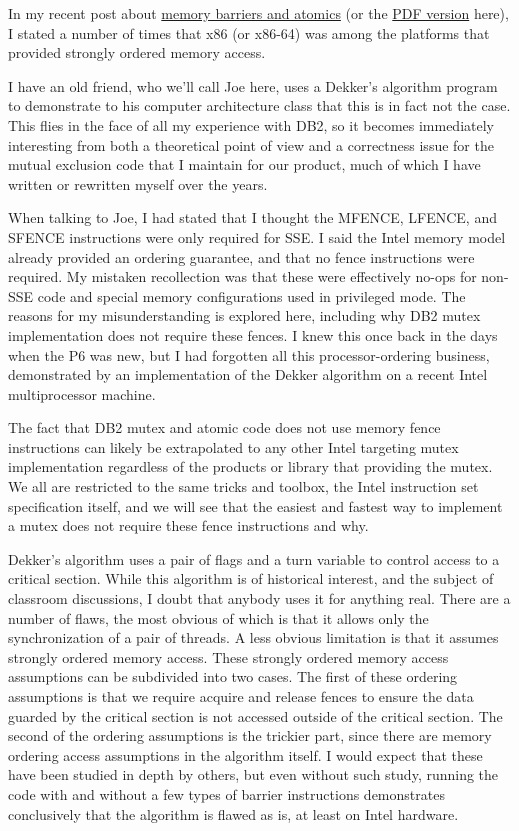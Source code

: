 In my recent post about \href{http://wp.me/ppf39-c1}{memory barriers and atomics} (or the \href{http://sites.google.com/site/peeterjoot/math2009/atomic.pdf?revision=1}{PDF version} here), I stated a number of times that x86 (or x86-64) was among the platforms that provided strongly ordered memory access.

I have an old friend, who we'll call Joe here, uses a Dekker's algorithm program to demonstrate to his computer architecture class that this is in fact not the case.  This flies in the face of all my experience with DB2, so it becomes immediately interesting from both a theoretical point of view and a correctness issue for the mutual exclusion code that I maintain for our product, much of which I have written or rewritten myself over the years.

When talking to Joe, I had stated that I thought the MFENCE, LFENCE, and SFENCE instructions were only required for SSE.  I said the Intel memory model already provided an ordering guarantee, and that no fence instructions were required.  My mistaken recollection was that these were effectively no-ops for non-SSE code and special memory configurations used in privileged mode.  
The reasons for my misunderstanding is explored here, including why DB2 mutex implementation does not require these fences.  I knew this once back in the days when the P6 was new, but I had forgotten all this processor-ordering business, demonstrated by an implementation of the Dekker algorithm on a recent Intel multiprocessor machine.

The fact that DB2 mutex and atomic code does not use memory fence instructions can likely be extrapolated to any other Intel targeting mutex implementation regardless of the products or library that providing the mutex.  We all are restricted to the same tricks and toolbox, the Intel instruction set specification itself, and we will see that the easiest and fastest way to implement a mutex does not require these fence instructions and why.

Dekker's algorithm uses a pair of flags and a turn variable to control access to a critical section.  While this algorithm is of historical interest, and the subject of classroom discussions, I doubt that anybody uses it for anything real.  There are a number of flaws, the most obvious of which is that it allows only the synchronization of a pair of threads.  A less obvious limitation is that it assumes strongly ordered memory access.  These strongly ordered memory access assumptions can be subdivided into two cases.  The first of these ordering assumptions is that we require acquire and release fences to ensure the data guarded by the critical section is not accessed outside of the critical section.  The second of the ordering assumptions is the trickier part, since there are memory ordering access assumptions in the algorithm itself.  I would expect that these have been studied in depth by others, but even without such study, running the code with and without a few types of barrier instructions demonstrates conclusively that the algorithm is flawed as is, at least on Intel hardware.
 

